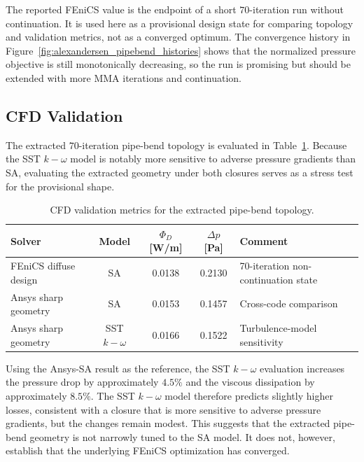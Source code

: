 The reported FEniCS value is the endpoint of a short $70$-iteration run without continuation. It is used here as a provisional design state for comparing topology and validation metrics, not as a converged optimum. The convergence history in Figure~\ref{fig:alexandersen_pipebend_histories} shows that the normalized pressure objective is still monotonically decreasing, so the run is promising but should be extended with more MMA iterations and continuation.


\subsection{CFD Validation}
\label{subsec:alexandersen_pipebend_cfd}
The extracted $70$-iteration pipe-bend topology is evaluated in Table~\ref{tab:alexandersen_pipebend_validation_metrics}. Because the SST $k-\omega$ model is notably more sensitive to adverse pressure gradients than SA, evaluating the extracted geometry under both closures serves as a stress test for the provisional shape.

\begin{table}[!ht]
	\centering
	\footnotesize
	\caption{CFD validation metrics for the extracted pipe-bend topology.}
	\label{tab:alexandersen_pipebend_validation_metrics}
	\renewcommand{\arraystretch}{1.2}
	\begin{tabularx}{\textwidth}{l c c c X}
		\hline
		\textbf{Solver} & \textbf{Model} & \textbf{$\Phi_D$ [W/m]} & \textbf{$\Delta p$ [Pa]} & \textbf{Comment} \\
		\hline
		FEniCS diffuse design & SA & 0.0138 & 0.2130 & 70-iteration non-continuation state \\
		Ansys sharp geometry & SA & 0.0153 & 0.1457 & Cross-code comparison \\
		Ansys sharp geometry & SST $k-\omega$ & 0.0166 & 0.1522 & Turbulence-model sensitivity \\
		\hline
	\end{tabularx}
\end{table}

Using the Ansys-SA result as the reference, the SST $k-\omega$ evaluation increases the pressure drop by approximately $4.5\%$ and the viscous dissipation by approximately $8.5\%$. The SST $k-\omega$ model therefore predicts slightly higher losses, consistent with a closure that is more sensitive to adverse pressure gradients, but the changes remain modest. This suggests that the extracted pipe-bend geometry is not narrowly tuned to the SA model. It does not, however, establish that the underlying FEniCS optimization has converged.

